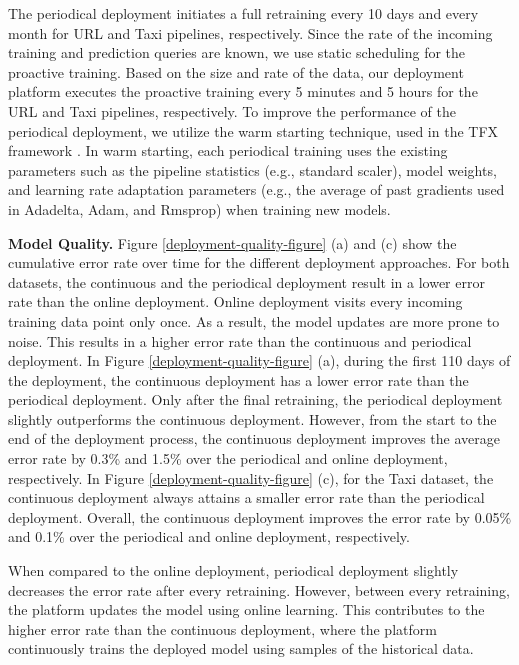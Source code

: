 The periodical deployment initiates a full retraining every 10 days and every month for URL and Taxi pipelines, respectively.
Since the rate of the incoming training and prediction queries are known, we use static scheduling for the proactive training.
Based on the size and rate of the data, our deployment platform executes the proactive training every 5 minutes and 5 hours for the URL and Taxi pipelines, respectively.
To improve the performance of the periodical deployment, we utilize the warm starting technique, used in the TFX framework \cite{baylor2017tfx}.
In warm starting, each periodical training uses the existing parameters such as the pipeline statistics (e.g., standard scaler), model weights, and learning rate adaptation parameters (e.g., the average of past gradients used in Adadelta, Adam, and Rmsprop) when training new models.

\textbf{Model Quality. }
Figure \ref{deployment-quality-figure} (a) and (c) show the cumulative error rate over time for the different deployment approaches.
For both datasets, the continuous and the periodical deployment result in a lower error rate than the online deployment.
Online deployment visits every incoming training data point only once.
As a result, the model updates are more prone to noise.
This results in a higher error rate than the continuous and periodical deployment.
In Figure \ref{deployment-quality-figure} (a), during the first 110 days of the deployment, the continuous deployment has a lower error rate than the periodical deployment.
Only after the final retraining, the periodical deployment slightly outperforms the continuous deployment.
However, from the start to the end of the deployment process, the continuous deployment improves the average error rate by 0.3\% and 1.5\% over the periodical and online deployment, respectively.
In Figure \ref{deployment-quality-figure}  (c), for the Taxi dataset, the continuous deployment always attains a smaller error rate than the periodical deployment.
Overall, the continuous deployment improves the error rate by 0.05\% and  0.1\% over the periodical and online deployment, respectively.

When compared to the online deployment, periodical deployment slightly decreases the error rate after every retraining.
However, between every retraining, the platform updates the model using online learning.
This contributes to the higher error rate than the continuous deployment, where the platform continuously trains the deployed model using samples of the historical data.

